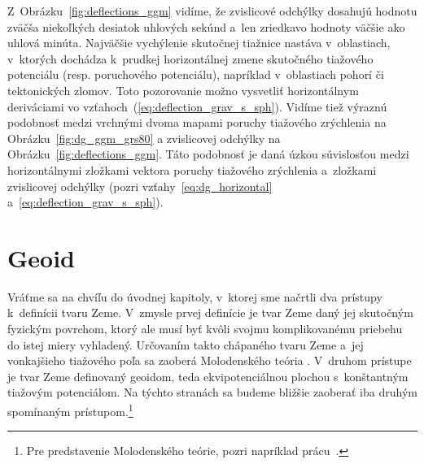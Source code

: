 \documentclass[a4paper, 12pt]{book}
\begin{document}
Z~Obrázku~\ref{fig:deflections_ggm} vidíme, že zvislicové odchýlky dosahujú 
hodnotu zväčša niekoľkých desiatok uhlových sekúnd a~len zriedkavo hodnoty 
väčšie ako uhlová minúta.  Najväčšie vychýlenie skutočnej tiažnice nastáva 
v~oblastiach, v~ktorých dochádza k~prudkej horizontálnej zmene skutočného 
tiažového potenciálu (resp. poruchového potenciálu), napríklad v~oblastiach 
pohorí či tektonických zlomov.  Toto pozorovanie možno vysvetliť horizontálnym 
deriváciami vo vzťahoch~(\ref{eq:deflection_grav_s_sph}).  Vidíme tiež výraznú 
podobnosť medzi vrchnými dvoma mapami poruchy tiažového zrýchlenia na 
Obrázku~\ref{fig:dg_ggm_grs80} a zvislicovej odchýlky na 
Obrázku~\ref{fig:deflections_ggm}.  Táto podobnosť je daná úzkou súvislosťou 
medzi horizontálnymi zložkami vektora poruchy tiažového zrýchlenia a~zložkami 
zvislicovej odchýlky (pozri vzťahy~\ref{eq:dg_horizontal} 
a~\ref{eq:deflection_grav_s_sph}).







\chapter{Geoid}
\label{sec:geoid}

Vráťme sa na chvíľu do úvodnej kapitoly, v~ktorej sme načrtli dva prístupy 
k~definícii tvaru Zeme.  V~zmysle prvej definície je tvar Zeme daný jej 
skutočným fyzickým povrchom, ktorý ale musí byť kvôli svojmu komplikovanému 
priebehu do istej miery vyhladený.  Určovaním takto chápaného tvaru Zeme a~jej 
vonkajšieho tiažového poľa sa zaoberá Molodenského teória 
\parencite{Molodensky1962,Borre_chapter8,MoritzAdvancedGeodesy,MoritzPhysicalGeodesy}.  
V~druhom prístupe je tvar Zeme definovaný geoidom, teda ekvipotenciálnou 
plochou s~konštantným tiažovým potenciálom.  Na týchto stranách sa budeme 
bližšie zaoberať iba druhým spomínaným prístupom.\footnote{Pre predstavenie 
Molodenského teórie, pozri napríklad prácu~\textcite{Janak2006}.}
\end{document}

